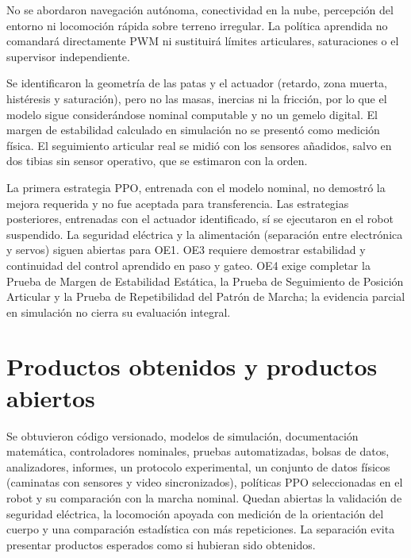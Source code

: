 No se abordaron navegación autónoma, conectividad en la nube, percepción del
entorno ni locomoción rápida sobre terreno irregular. La política aprendida no
comandará directamente PWM ni sustituirá límites articulares, saturaciones o el
supervisor independiente.

Se identificaron la geometría de las patas y el actuador (retardo, zona
muerta, histéresis y saturación), pero no las masas, inercias ni la fricción, por
lo que el modelo sigue considerándose nominal computable y no un gemelo
digital. El margen de estabilidad calculado en simulación no se presentó como
medición física. El seguimiento articular real se midió con los sensores
añadidos, salvo en dos tibias sin sensor operativo, que se estimaron con la
orden.

La primera estrategia PPO, entrenada con el modelo nominal, no demostró la
mejora requerida y no fue aceptada para transferencia. Las estrategias
posteriores, entrenadas con el actuador identificado, sí se ejecutaron en el
robot suspendido. La seguridad eléctrica y la alimentación (separación entre
electrónica y servos) siguen abiertas para OE1. OE3 requiere demostrar estabilidad y continuidad del control aprendido
en paso y gateo. OE4 exige completar la Prueba de Margen de Estabilidad Estática,
la Prueba de Seguimiento de Posición Articular y la Prueba de Repetibilidad del
Patrón de Marcha; la evidencia parcial en simulación no cierra su evaluación integral.

\section{Productos obtenidos y productos abiertos}

Se obtuvieron código versionado, modelos de simulación, documentación
matemática, controladores nominales, pruebas automatizadas, bolsas de datos,
analizadores, informes, un protocolo experimental, un conjunto de datos físicos
(caminatas con sensores y video sincronizados), políticas PPO seleccionadas en
el robot y su comparación con la marcha nominal. Quedan abiertas la validación
de seguridad eléctrica, la locomoción apoyada con medición de la orientación
del cuerpo y una comparación estadística con más repeticiones. La separación evita presentar productos esperados como si
hubieran sido obtenidos.
